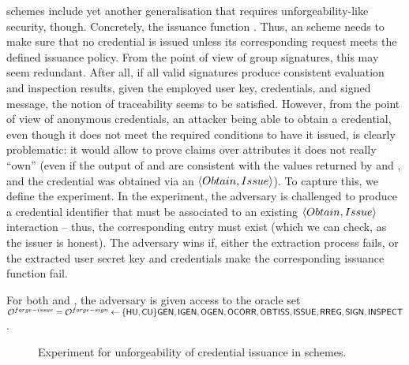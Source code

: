 \UAS schemes include yet another generalisation that requires unforgeability-like
security, though. Concretely, the issuance function \fissue. Thus, an \UAS
scheme needs to make sure that no credential is issued unless its corresponding
request meets the defined issuance policy. From the point of view of group
signatures, this may seem redundant. After all, if all valid signatures produce
consistent evaluation and inspection results, given the employed user key,
credentials, and signed message, the notion of traceability seems to be
satisfied. However, from the point of view of anonymous credentials, an attacker
being able to obtain a credential, even though it does not meet the required
conditions to have it issued, is clearly problematic: it would allow to prove
claims over attributes it does not really ``own'' (even if the output of \Sign
and \Inspect are consistent with the values returned by \feval and \finsp, and
the credential was obtained via an $\langle Obtain,Issue \rangle$). To capture
this, we define the \ExpForgeIssue experiment. In the experiment, the adversary
is challenged to produce a credential identifier that must be associated to an
existing $\langle Obtain,Issue \rangle$ interaction -- thus, the corresponding
\trans entry must exist (which we can check, as the issuer is honest).
The adversary wins if, either the extraction process fails, or the extracted
user secret key and credentials make the corresponding issuance function fail.

For both \ExpForgeIssue and \ExpForgeSign, the adversary is given access to the
oracle set $\mathcal{O}^{forge-issue} = \mathcal{O}^{forge-sign} \gets \lbrace\mathsf{HU},\mathsf{CU}\rbrace\mathsf{GEN},\mathsf{IGEN},
\mathsf{OGEN},\mathsf{OCORR},\mathsf{OBTISS},\mathsf{ISSUE},\mathsf{RREG},\mathsf{SIGN},\mathsf{INSPECT}$.

\begin{figure}[htp!]
  \caption{Experiment for unforgeability of credential issuance in \UAS schemes.}
  \label{fig:exp-uas-unfor-issue}
\end{figure}    

